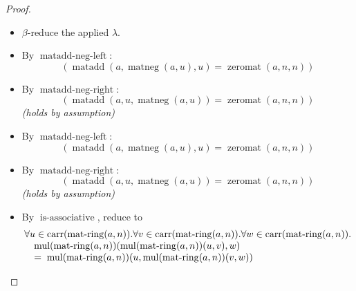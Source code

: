\documentclass[11pt]{article}
\theoremstyle{plain}
\begin{document}
\begin{proof}
\begin{itemize}[leftmargin=2.8em, itemsep=4pt, parsep=1pt]
  \item[\textbf{79}] $\beta$-reduce the applied $\lambda$.
  \item[\textbf{80--82}] By $\operatorname{matadd\text{-}neg\text{-}left}$:
\begin{equation*}
(\operatorname{matadd}(a, \operatorname{matneg}(a, u), u) = \operatorname{zeromat}(a, n, n))
\end{equation*}

  \item[\textbf{83--84}] By $\operatorname{matadd\text{-}neg\text{-}right}$:
\begin{equation*}
(\operatorname{matadd}(a, u, \operatorname{matneg}(a, u)) = \operatorname{zeromat}(a, n, n))
\end{equation*}
  \emph{(holds by assumption)}
  \item[\textbf{85}] By $\operatorname{matadd\text{-}neg\text{-}left}$:
\begin{equation*}
(\operatorname{matadd}(a, \operatorname{matneg}(a, u), u) = \operatorname{zeromat}(a, n, n))
\end{equation*}

  \item[\textbf{86--87}] By $\operatorname{matadd\text{-}neg\text{-}right}$:
\begin{equation*}
(\operatorname{matadd}(a, u, \operatorname{matneg}(a, u)) = \operatorname{zeromat}(a, n, n))
\end{equation*}
  \emph{(holds by assumption)}
  \item[\textbf{88}] By $\operatorname{is\text{-}associative}$, reduce to
\begin{equation*}
\begin{array}{@{}l@{}} \forall u \in \operatorname{carr}(\operatorname{mat\text{-}ring}(a, n)). \forall v \in \operatorname{carr}(\operatorname{mat\text{-}ring}(a, n)). \forall w \in \operatorname{carr}(\operatorname{mat\text{-}ring}(a, n)). \\ \quad \operatorname{mul}(\operatorname{mat\text{-}ring}(a, n))(\operatorname{mul}(\operatorname{mat\text{-}ring}(a, n))(u, v), w) \\ \quad =\; \operatorname{mul}(\operatorname{mat\text{-}ring}(a, n))(u, \operatorname{mul}(\operatorname{mat\text{-}ring}(a, n))(v, w)) \end{array}
\end{equation*}


\end{itemize}
\end{proof}
\end{document}
